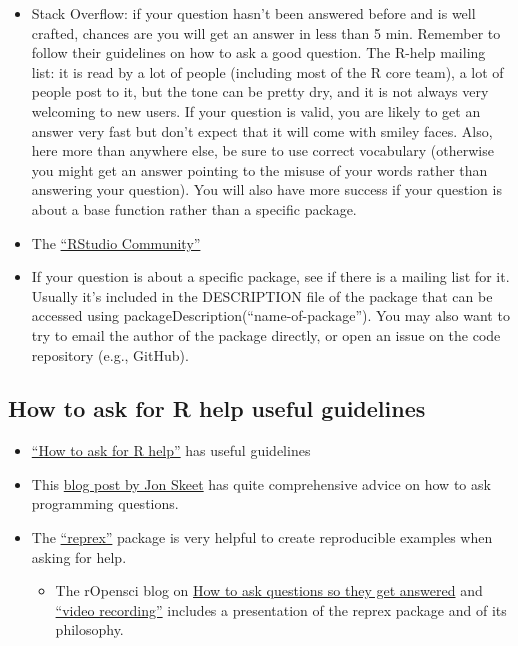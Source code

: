 \documentclass[]{book}
\providecommand{\tightlist}{%
  \setlength{\itemsep}{0pt}\setlength{\parskip}{0pt}}
\begin{document}
\begin{itemize}
\tightlist
\item
  Stack Overflow: if your question hasn't been answered before and is well crafted, chances are you will get an answer in less than 5 min. Remember to follow their guidelines on how to ask a good question.
  The R-help mailing list: it is read by a lot of people (including most of the R core team), a lot of people post to it, but the tone can be pretty dry, and it is not always very welcoming to new users. If your question is valid, you are likely to get an answer very fast but don't expect that it will come with smiley faces. Also, here more than anywhere else, be sure to use correct vocabulary (otherwise you might get an answer pointing to the misuse of your words rather than answering your question). You will also have more success if your question is about a base function rather than a specific package.
\item
  The \href{https://community.rstudio.com/}{``RStudio Community''}
\item
  If your question is about a specific package, see if there is a mailing list for it. Usually it's included in the DESCRIPTION file of the package that can be accessed using packageDescription(``name-of-package''). You may also want to try to email the author of the package directly, or open an issue on the code repository (e.g., GitHub).
\end{itemize}

\hypertarget{how-to-ask-for-r-help-useful-guidelines}{%
\subsection*{How to ask for R help useful guidelines}\label{how-to-ask-for-r-help-useful-guidelines}}

\begin{itemize}
\tightlist
\item
  \href{https://blog.revolutionanalytics.com/2014/01/how-to-ask-for-r-help.html}{``How to ask for R help''} has useful guidelines
\item
  This \href{https://codeblog.jonskeet.uk/2010/08/29/writing-the-perfect-question/}{blog post by Jon Skeet} has quite comprehensive advice on how to ask programming questions.
\item
  The \href{https://cran.rstudio.com/web/packages/reprex/}{``reprex''} package is very helpful to create reproducible examples when asking for help.

  \begin{itemize}
  \tightlist
  \item
    The rOpensci blog on \href{https://ropensci.org/commcalls/2017-03-07/}{How to ask questions so they get answered} and \href{https://vimeo.com/208749032}{``video recording''} includes a presentation of the reprex package and of its philosophy.
  \end{itemize}
\end{itemize}
\end{document}
